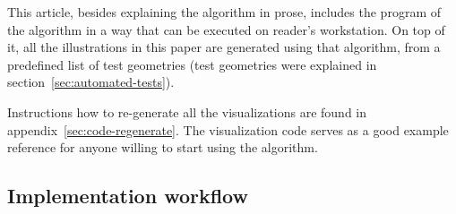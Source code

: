 \documentclass[a4paper]{article}
\begin{document}
This article, besides explaining the algorithm in prose, includes the program
of the algorithm in a way that can be executed on reader's workstation. On top
of it, all the illustrations in this paper are generated using that algorithm,
from a predefined list of test geometries (test geometries were explained in
section~\ref{sec:automated-tests}).

Instructions how to re-generate all the visualizations are found in
appendix~\ref{sec:code-regenerate}. The visualization code serves as a good
example reference for anyone willing to start using the algorithm.

\subsection{Implementation workflow}

\end{document}
